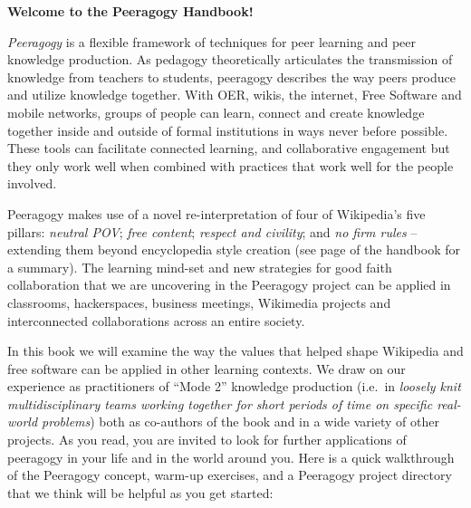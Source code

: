 \textbf{Welcome to the Peeragogy Handbook!}


\emph{Peeragogy} is a flexible framework of techniques for peer learning and
peer knowledge production.  As pedagogy theoretically articulates the
transmission of knowledge from teachers to students, peeragogy
describes the way peers produce and utilize knowledge together.  With
OER, wikis, the internet, Free Software and mobile networks, groups of
people can learn, connect and create knowledge together inside and
outside of formal institutions in ways never before possible.  These
tools can facilitate connected learning, and collaborative engagement
but they only work well when combined with practices that work well
for the people involved.

Peeragogy makes use of a novel re-interpretation of four of
Wikipedia's five pillars: \emph{neutral POV}; \emph{free
content}; \emph{respect and civility}; and \emph{no firm rules} --
extending them beyond encyclopedia style creation (see
page \pageref{good-faith-collaboration} of the handbook for a
summary).  The learning mind-set and new strategies for good faith
collaboration that we are uncovering in the Peeragogy project can be
applied in classrooms, hackerspaces, business meetings, Wikimedia
projects and interconnected collaborations across an entire society.

In this book we will examine the way the values that helped shape
Wikipedia and free software can be applied in other learning contexts.
We draw on our experience as practitioners of ``Mode 2'' knowledge
production (i.e.~in \emph{loosely knit multidisciplinary teams working
together for short periods of time on specific real-world problems})
both as co-authors of the book and in a wide variety of other
projects.
%
As you read, you are invited to look for further applications of
peeragogy in your life and in the world around you.
%
Here is a quick walkthrough of the Peeragogy concept, warm-up
exercises, and a Peeragogy project directory that we think will be
helpful as you get started:

\clearpage


